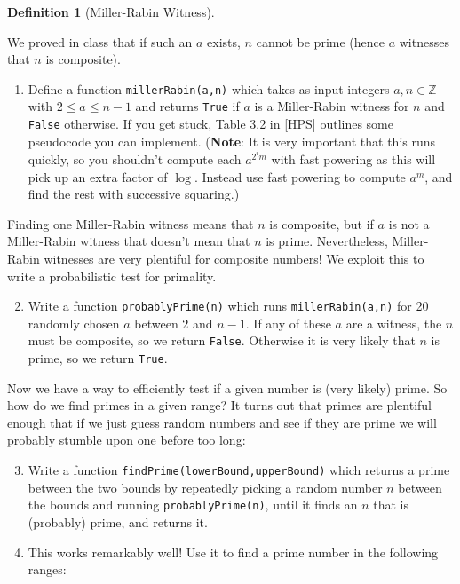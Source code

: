 \documentclass[11pt]{article}
\newtheorem{definition}{Definition}
\newcommand{\bZ}{\mathbb{Z}}
\begin{document}
\begin{enumerate}
{\begin{definition}[Miller-Rabin Witness]
\begin{itemize}
    \end{itemize}
  \end{definition}
  We proved in class that if such an $a$ exists, $n$ cannot be prime (hence $a$ witnesses that $n$ is composite).
  \begin{enumerate}
    \item{
    Define a function \verb|millerRabin(a,n)| which takes as input integers $a,n\in\bZ$ with $2\le a\le n-1$ and returns \verb|True| if $a$ is a Miller-Rabin witness for $n$ and \verb|False| otherwise.  If you get stuck, Table 3.2 in [HPS] outlines some pseudocode you can implement.   (\textbf{Note}: It is very important that this runs quickly, so you shouldn't compute each $a^{2^im}$ with fast powering as this will pick up an extra factor of $\log$.  Instead use fast powering to compute $a^m$, and find the rest with successive squaring.)
    }
  \end{enumerate}
  Finding one Miller-Rabin witness means that $n$ is composite, but if $a$ is not a Miller-Rabin witness that doesn't mean that $n$ is prime.  Nevertheless, Miller-Rabin witnesses are very plentiful for composite numbers!  We exploit this to write a probabilistic test for primality.
  \begin{enumerate}
    \setcounter{enumii}{1}
    \item{
    Write a function \verb|probablyPrime(n)| which runs \verb|millerRabin(a,n)| for 20 randomly chosen $a$ between $2$ and $n-1$.  If any of these $a$ are a witness, the $n$ must be composite, so we return \verb|False|.  Otherwise it is very likely that $n$ is prime, so we return \verb|True|.
    }
  \end{enumerate}
  Now we have a way to efficiently test if a given number is (very likely) prime.  So how do we find primes in a given range?  It turns out that primes are plentiful enough that if we just guess random numbers and see if they are prime we will probably stumble upon one before too long:
  \begin{enumerate}
    \setcounter{enumii}{2}
    \item{
    Write a function \verb|findPrime(lowerBound,upperBound)| which returns a prime between the two bounds by repeatedly picking a random number $n$ between the bounds and running \verb|probablyPrime(n)|, until it finds an $n$ that is (probably) prime, and returns it.
    }
    \item{
    This works remarkably well!  Use it to find a prime number in the following ranges:
    \begin{enumerate}

\end{enumerate}}
\end{enumerate}}
\end{enumerate}
\end{document}
